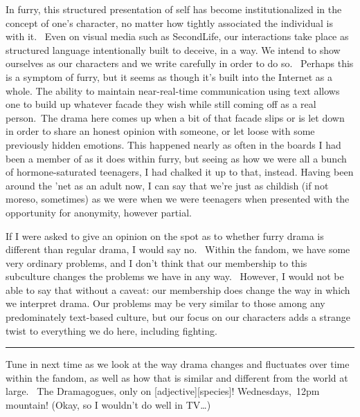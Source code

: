 In furry, this structured presentation of self has become
institutionalized in the concept of one's character, no matter how
tightly associated the individual is with it. ~Even on visual media such
as SecondLife, our interactions take place as structured language
intentionally built to deceive, in a way. We intend to show ourselves as
our characters and we write carefully in order to do so. ~Perhaps this
is a symptom of furry, but it seems as though it's built into the
Internet as a whole. The ability to maintain near-real-time
communication using text allows one to build up whatever facade they
wish while still coming off as a real person.~The drama here comes up
when a bit of that facade slips or is let down in order to share an
honest opinion with someone, or let loose with some previously hidden
emotions. This happened nearly as often in the boards I had been a
member of as it does within furry, but seeing as how we were all a bunch
of hormone-saturated teenagers, I had chalked it up to that, instead.
Having been around the 'net as an adult now, I can say that we're just
as childish (if not moreso, sometimes) as we were when we were teenagers
when presented with the opportunity for anonymity, however partial.

If I were asked to give an opinion on the spot as to whether furry drama
is different than regular drama, I would say no. ~Within the fandom, we
have some very ordinary problems, and I don't think that our membership
to this subculture changes the problems we have in any way. ~However, I
would not be able to say that without a caveat: our membership does
change the way in which we interpret drama. Our problems may be very
similar to those among any predominately text-based culture, but our
focus on our characters adds a strange twist to everything we do here,
including fighting.

\begin{center}\rule{0.5\linewidth}{\linethickness}\end{center}

Tune in next time as we look at the way drama changes and fluctuates
over time within the fandom, as well as how that is similar and
different from the world at large. ~The Dramagogues, only on
{[}adjective{]}{[}species{]}! Wednesdays,~12pm mountain! (Okay, so I
wouldn't do well in TV\ldots{})
